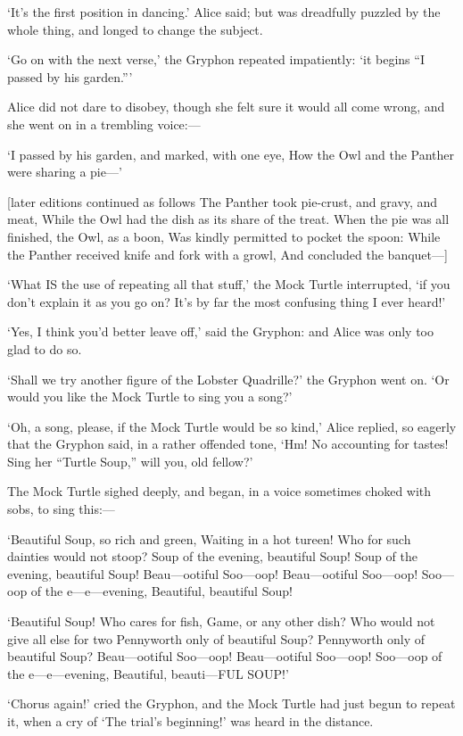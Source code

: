 \documentclass[12pt]{article}
\begin{document}
\begin{Parallel}[p]{}{}
{‘It’s the first position in dancing.’ Alice said; but was dreadfully puzzled by the whole thing, and longed to change the subject.

‘Go on with the next verse,’ the Gryphon repeated impatiently: ‘it begins “I passed by his garden.”’

Alice did not dare to disobey, though she felt sure it would all come wrong, and she went on in a trembling voice:—

  ‘I passed by his garden, and marked, with one eye,
  How the Owl and the Panther were sharing a pie—’

    [later editions continued as follows
  The Panther took pie-crust, and gravy, and meat,
  While the Owl had the dish as its share of the treat.
  When the pie was all finished, the Owl, as a boon,
  Was kindly permitted to pocket the spoon:
  While the Panther received knife and fork with a growl,
  And concluded the banquet—]

‘What IS the use of repeating all that stuff,’ the Mock Turtle interrupted, ‘if you don’t explain it as you go on? It’s by far the most confusing thing I ever heard!’

‘Yes, I think you’d better leave off,’ said the Gryphon: and Alice was only too glad to do so.

‘Shall we try another figure of the Lobster Quadrille?’ the Gryphon went on. ‘Or would you like the Mock Turtle to sing you a song?’

‘Oh, a song, please, if the Mock Turtle would be so kind,’ Alice replied, so eagerly that the Gryphon said, in a rather offended tone, ‘Hm! No accounting for tastes! Sing her “Turtle Soup,” will you, old fellow?’

The Mock Turtle sighed deeply, and began, in a voice sometimes choked with sobs, to sing this:—

   ‘Beautiful Soup, so rich and green,
   Waiting in a hot tureen!
   Who for such dainties would not stoop?
   Soup of the evening, beautiful Soup!
   Soup of the evening, beautiful Soup!
     Beau—ootiful Soo—oop!
     Beau—ootiful Soo—oop!
   Soo—oop of the e—e—evening,
     Beautiful, beautiful Soup!

   ‘Beautiful Soup! Who cares for fish,
   Game, or any other dish?
   Who would not give all else for two
   Pennyworth only of beautiful Soup?
   Pennyworth only of beautiful Soup?
     Beau—ootiful Soo—oop!
     Beau—ootiful Soo—oop!
   Soo—oop of the e—e—evening,
     Beautiful, beauti—FUL SOUP!’

‘Chorus again!’ cried the Gryphon, and the Mock Turtle had just begun to repeat it, when a cry of ‘The trial’s beginning!’ was heard in the distance.

}
\end{Parallel}
\end{document}
